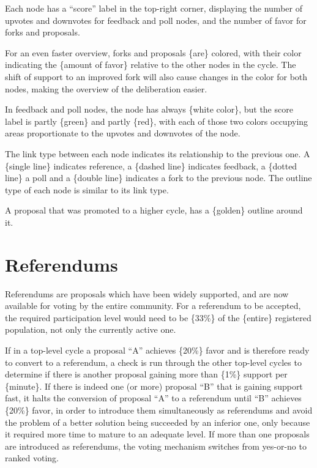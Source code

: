 \documentclass[a4paper,11pt]{article}
\begin{document}
\begin{multicols}{2}
Each node has a “score” label in the top-right corner, displaying the number of upvotes and downvotes for feedback and poll nodes, and the number of favor for forks and proposals. 

For an even faster overview, forks and proposals \{are\} colored, with their color indicating the \{amount of favor\} relative to the other nodes in the cycle. The shift of support to an improved fork will also cause changes in the color for both nodes, making the overview of the deliberation easier.

In feedback and poll nodes, the node has always \{white color\}, but the score label is partly \{green\} and partly \{red\}, with each of those two colors occupying areas proportionate to the upvotes and downvotes of the node.

The link type between each node indicates its relationship to the previous one. A \{single line\} indicates reference, a \{dashed line\} indicates feedback, a \{dotted line\} a poll and a \{double line\} indicates a fork to the previous node. The outline type of each node is similar to its link type.

A proposal that was promoted to a higher cycle, has a \{golden\} outline around it.  

\section{Referendums} \label{referendums}

Referendums are proposals which have been widely supported, and are now available for voting by the entire community. For a referendum to be accepted, the required participation level would need to be \{33\%\} of the \{entire\} registered population, not only the currently active one.

If in a top-level cycle a proposal “A” achieves \{20\%\} favor and is therefore ready to convert to a referendum, a check is run through the other top-level cycles to determine if there is another proposal gaining more than \{1\%\} support per \{minute\}. If there is indeed one (or more) proposal “B” that is gaining support fast, it halts the conversion of proposal “A” to a referendum until “B” achieves \{20\%\} favor, in order to introduce them simultaneously as referendums and avoid the problem of a better solution being succeeded by an inferior one, only because it required more time to mature to an adequate level. If more than one proposals are introduced as referendums, the voting mechanism switches from yes-or-no to ranked voting.


\end{multicols}
\end{document}
